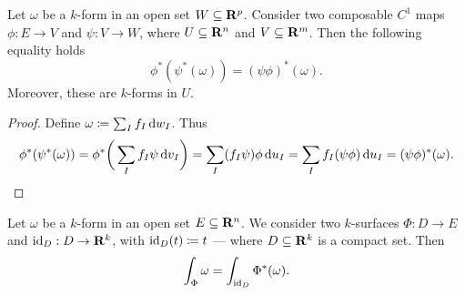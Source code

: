 \begin{lemma}
\label{lem:pullback-composition-forms}
Let \(\omega\) be a \(k\)-form in an open set \(W \subseteq \mathbf{R}^p\). Consider two
composable \(C^1\) maps \(\phi: E \to V\) and \(\psi: V \to W\), where \(U
\subseteq \mathbf{R}^n\) and \(V \subseteq \mathbf{R}^m\). Then the following equality holds
\[
  \phi^{*}(\psi^{*}(\omega)) = {(\psi \phi)}^{*}(\omega).
\]
Moreover, these are \(k\)-forms in \(U\).
\end{lemma}

\begin{proof}
Define \(\omega \coloneq \sum_I f_I\, \mathrm{d} w_I\). Thus
\begin{align*}
  \phi^{*}(\psi^{*}(\omega))
  = \phi^{*} \bigg( \sum_I f_I \psi\, \mathrm{d} v_I \bigg)
  = \sum_I (f_I \psi) \phi\, \mathrm{d} u_I
  = \sum_I f_I (\psi \phi)\, \mathrm{d} u_I
  = (\psi \phi)^{*} (\omega).
\end{align*}
\end{proof}

\begin{lemma}
\label{lem:integral-on-k-surface}
Let \(\omega\) be a \(k\)-form in an open set \(E \subseteq \mathbf{R}^n\). We consider
two \(k\)-surfaces \(\Phi: D \to E\) and \(\operatorname{id}_D: D \to \mathbf{R}^k\), with \(\operatorname{id}_D(t)
\coloneq t\) --- where \(D \subseteq \mathbf{R}^k\) is a compact set. Then
\[
  \int_{\Phi} \omega = \int_{\operatorname{id}_D} \Phi^{*}(\omega).
\]
\end{lemma}

